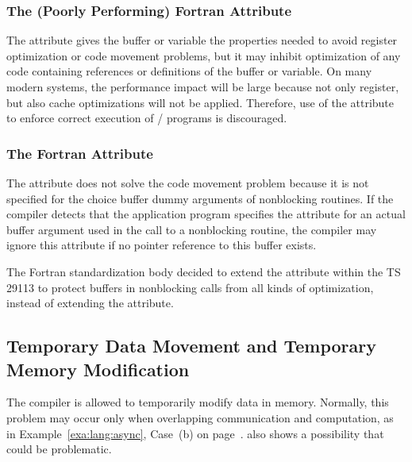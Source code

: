 \subsubsection{The (Poorly Performing) Fortran \texorpdfstring{}{VOLATILE} Attribute}
\label{sec:f90-problems:volatile}

The  attribute
gives the buffer or variable the properties needed to avoid register
optimization or code movement problems, but it may inhibit
optimization of any code containing references or definitions of the buffer or variable.
On many modern systems, the performance impact will be large because
not only register, but also cache optimizations will not be
applied. Therefore, use of the  attribute to enforce
correct execution of \MPI/ programs is discouraged.

\subsubsection{The Fortran \texorpdfstring{}{TARGET} Attribute}
\label{sec:f90-problems:code-movements:target}

The  attribute does not solve the code movement problem
because it is not specified for the choice buffer dummy arguments
of nonblocking routines.
If the compiler detects that the application program specifies the
 attribute for an actual buffer argument used
in the call to a nonblocking routine,
the compiler may ignore this attribute if
no pointer reference to this buffer exists.
\begin{rationale}
The Fortran standardization body decided to extend the  attribute
within the TS 29113 to protect buffers in nonblocking
calls
from all kinds of optimization, instead of extending the  attribute.
\end{rationale}

\subsection{Temporary Data Movement and Temporary Memory Modification}
\label{sec:f90-problems:temp-data-movements}

The compiler is allowed to temporarily modify data in memory.
Normally, this problem may occur only when overlapping communication and computation,
as in Example~\ref{exa:lang:async}, Case~(b) on page~\pageref{exa:lang:async}.
also shows a possibility
that could be problematic.

